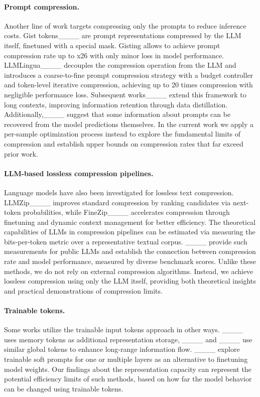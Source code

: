 \paragraph{Prompt compression.} Another line of work targets compressing only the prompts to reduce inference costs. Gist tokens____ are prompt representations compressed by the LLM itself, finetuned with a special mask. Gisting allows to achieve prompt compression rate up to x26 with only minor loss in model performance. LLMLingua____ decouples the compression operation from the LLM and introduces a coarse-to-fine prompt compression strategy with a budget controller and token-level iterative compression, achieving up to 20 times compression with negligible performance loss. Subsequent works____ extend this framework to long contexts, improving information retention through data distillation. 
Additionally,____ suggest that some information about prompts can be recovered from the model predictions themselves. 
In the current work
we apply a per-sample optimization process instead to explore the fundamental limits of compression
and establish upper bounds on compression rates that far exceed prior work.

\paragraph{LLM-based lossless compression pipelines.} Language models have also been investigated for lossless text compression. LLMZip____ improves standard compression by ranking candidates via next-token probabilities, while FineZip____ accelerates compression through finetuning and dynamic context management for better efficiency.
The theoretical capabilities of LLMs in compression pipelines can be estimated via measuring the bits-per-token metric over a representative textual corpus. ____ provide such measurements for public LLMs and establish the connection between compression rate and model performance, measured by diverse benchmark scores. 
Unlike these methods, we do not rely on external compression algorithms. Instead, we achieve lossless compression using only the LLM itself, providing both theoretical insights and practical demonstrations of compression limits.

\paragraph{Trainable tokens.} Some works utilize the trainable input tokens approach in other ways. ____ uses memory tokens as additional representation storage, ____ and ____ use similar global tokens to enhance long-range information flow. ____ explore trainable soft prompts for one or multiple layers as an alternative to finetuning model weights. 
Our findings about the representation capacity can represent the potential efficiency limits of such methods, based on how far the model behavior can be changed using trainable tokens.